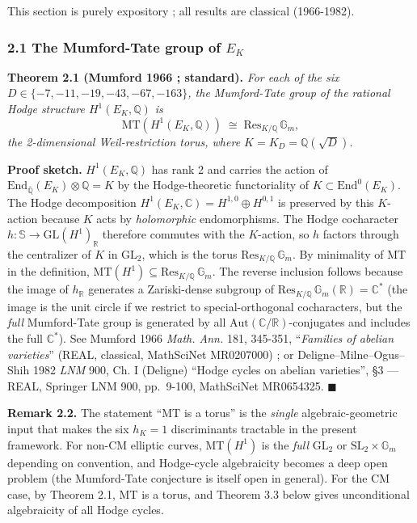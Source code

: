 \documentclass[
  11pt,
  a4paper,
]{article}
\begin{document}
This section is purely expository ; all results are classical (1966-1982).

\hypertarget{the-mumford-tate-group-of-e_k}{%
\subsubsection{\texorpdfstring{2.1 The Mumford-Tate group of \(E_K\)}{2.1 The Mumford-Tate group of E\_K}}\label{the-mumford-tate-group-of-e_k}}

\textbf{Theorem 2.1 (Mumford 1966 ; standard).} \emph{For each of the six \(D \in \{-7, -11, -19, -43, -67, -163\}\), the Mumford-Tate group of the rational Hodge structure \(H^1(E_K, \mathbb{Q})\) is}
\[
\mathrm{MT}(H^1(E_K, \mathbb{Q})) \;\cong\; \mathrm{Res}_{K/\mathbb{Q}}\,\mathbb{G}_m,
\]
\emph{the 2-dimensional Weil-restriction torus, where \(K = K_D = \mathbb{Q}(\sqrt{D})\).}

\textbf{Proof sketch.} \(H^1(E_K, \mathbb{Q})\) has rank 2 and carries the action of \(\mathrm{End}_{\overline{\mathbb{Q}}}(E_K) \otimes \mathbb{Q} = K\) by the Hodge-theoretic functoriality of \(K \subset \mathrm{End}^0(E_K)\). The Hodge decomposition \(H^1(E_K, \mathbb{C}) = H^{1, 0} \oplus H^{0, 1}\) is preserved by this \(K\)-action because \(K\) acts by \emph{holomorphic} endomorphisms. The Hodge cocharacter \(h : \mathbb{S} \to \mathrm{GL}(H^1)_\mathbb{R}\) therefore commutes with the \(K\)-action, so \(h\) factors through the centralizer of \(K\) in \(\mathrm{GL}_2\), which is the torus \(\mathrm{Res}_{K/\mathbb{Q}}\,\mathbb{G}_m\). By minimality of MT in the definition, \(\mathrm{MT}(H^1) \subseteq \mathrm{Res}_{K/\mathbb{Q}}\,\mathbb{G}_m\). The reverse inclusion follows because the image of \(h_\mathbb{R}\) generates a Zariski-dense subgroup of \(\mathrm{Res}_{K/\mathbb{Q}}\,\mathbb{G}_m(\mathbb{R}) = \mathbb{C}^*\) (the image is the unit circle if we restrict to special-orthogonal cocharacters, but the \emph{full} Mumford-Tate group is generated by all \(\mathrm{Aut}(\mathbb{C}/\mathbb{R})\)-conjugates and includes the full \(\mathbb{C}^*\)). See Mumford 1966 \emph{Math. Ann.} 181, 345-351, ``\emph{Families of abelian varieties}'' (REAL, classical, MathSciNet MR0207000) ; or Deligne--Milne--Ogus--Shih 1982 \emph{LNM} 900, Ch. I (Deligne) ``Hodge cycles on abelian varieties'', §3 --- REAL, Springer LNM 900, pp.~9-100, MathSciNet MR0654325. \(\blacksquare\)

\textbf{Remark 2.2.} The statement ``MT is a torus'' is the \emph{single} algebraic-geometric input that makes the six \(h_K = 1\) discriminants tractable in the present framework. For non-CM elliptic curves, \(\mathrm{MT}(H^1)\) is the \emph{full} \(\mathrm{GL}_2\) or \(\mathrm{SL}_2 \times \mathbb{G}_m\) depending on convention, and Hodge-cycle algebraicity becomes a deep open problem (the Mumford-Tate conjecture is itself open in general). For the CM case, by Theorem 2.1, MT is a torus, and Theorem 3.3 below gives unconditional algebraicity of all Hodge cycles.
\end{document}
